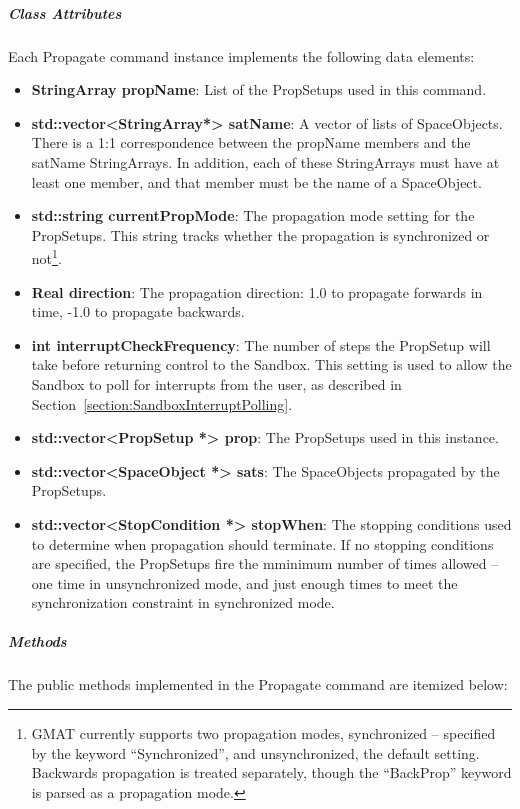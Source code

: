 \subparagraph{\textit{Class Attributes}}

Each Propagate command instance implements the following data elements:

\begin{itemize}
\item \textbf{StringArray propName}:  List of the PropSetups used in this command.
\item \textbf{std::vector<StringArray*> satName}:  A vector of lists of SpaceObjects.  There is a
1:1 correspondence between the propName members and the satName StringArrays.  In addition, each of
these StringArrays must have at least one member, and that member must be the name of a SpaceObject.
\item \textbf{std::string currentPropMode}:  The propagation mode setting for the PropSetups.  This
string tracks whether the propagation is synchronized or not\footnote{GMAT currently supports two
propagation modes, synchronized -- specified by the keyword ``Synchronized'', and unsynchronized,
the default setting.  Backwards propagation is treated separately, though the ``BackProp'' keyword
is parsed as a propagation mode.}.
\item \textbf{Real direction}: The propagation direction: 1.0 to propagate forwards in time, -1.0
to propagate backwards.
\item \textbf{int interruptCheckFrequency}:  The number of steps the PropSetup will take before
returning control to the Sandbox.  This setting is used to allow the Sandbox to poll for interrupts
from the user, as described in Section~\ref{section:SandboxInterruptPolling}.
\item \textbf{std::vector<PropSetup *> prop}:  The PropSetups used in this instance.
\item \textbf{std::vector<SpaceObject *> sats}:  The SpaceObjects propagated by the PropSetups.
\item \textbf{std::vector<StopCondition *> stopWhen}:  The stopping conditions used to determine
when propagation should terminate.  If no stopping conditions are specified, the PropSetups fire
the mminimum number of times allowed -- one time in unsynchronized mode, and just enough times to
meet the synchronization constraint in synchronized mode.
\end{itemize}

\subparagraph{\textit{Methods}}

The public methods implemented in the Propagate command are itemized below:

